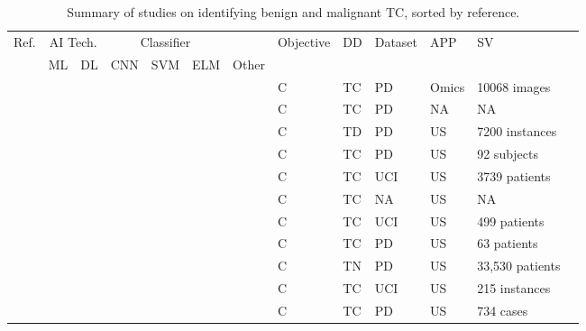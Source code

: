 \documentclass[a4paper,fleqn]{cas-sc}
\newcommand{\cmark}{\ding{51}}%
\begin{document}
\begin{table}[t!]
\caption{Summary of studies on identifying benign and malignant TC, sorted by reference. }
\label{table:2}
\scriptsize
\begin{tabular}{
m{0.5cm}
m{0.3cm}
m{0.3cm}
m{0.3cm}
m{0.3cm}
m{0.3cm}
m{0.3cm}
m{1.3cm}
m{1.3cm}
m{1.3cm}
m{1.3cm}
m{2.3cm}
m{2.3cm}
}
\hline 

Ref. & \multicolumn{2}{c}{AI Tech.} & \multicolumn{3}{c}{Classifier} & & Objective & DD & Dataset & APP & SV \\
\cline{2-3}
\cline{4-7}
 & ML& DL & CNN & SVM & ELM & Other & & & & &   \\  \hline

\cite{sajeev2020thyroid} & & \cmark & \cmark & & & & C & TC & PD & Omics & 10068 images \\

\cite{soulaymani2018epidemiological} & & \cmark & & & & \cmark & C & TC & PD & NA & NA \\ 

\cite{chandel2016comparative} &  \cmark & & & & & \cmark & C & TD & PD & US & 7200 instances \\ 

\cite{ma2010differential} &  \cmark & & & \cmark & & & C & TC & PD & US & 92 subjects  \\

\cite{yadav2020prediction} &  \cmark & & & & & \cmark & C & TC & UCI & US & 3739 patients \\ 

\cite{dharmarajan2020thyroid} &  \cmark & & & & & \cmark & C & TC & NA & US & NA \\ 

\cite{yadav2019decision} &  \cmark & & & & & \cmark & C & TC & UCI & US & 499 patients \\ 

\cite{zhao2015logistic} & \cmark & & & & & \cmark & C & TC & PD & US & 63 patients \\

\cite{yazdani2018factors} & \cmark & & & & & \cmark & C & TN & PD & US & 33,530 patients \\ 

\cite{mahurkar2017normalization} &  \cmark & & & & & \cmark & C & TC & UCI & US & 215  instances \\ 

\cite{yang2019information} &  \cmark & & & & & \cmark & C & TC & PD & US & 734 cases \\ 


\end{tabular}
\end{table}
\end{document}
